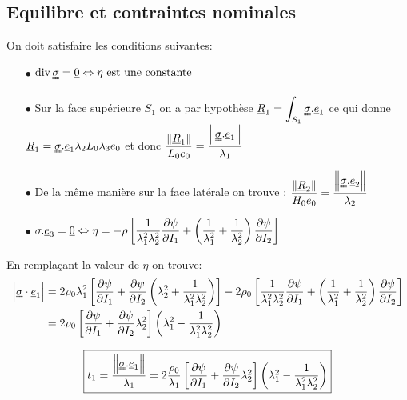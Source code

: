 \documentclass[a4paper,11pt]{article}
\newcommand{\FRAC}{\displaystyle\frac}
\newcommand{\tens}{\uuline}
\newcommand{\verseur}[1]{\uline{e}_{#1}}
\newcommand{\dive}{\mathop{\rm div}}
\begin{document}
\subsection{Equilibre et contraintes nominales}

On doit satisfaire les conditions suivantes:
\begin{itemize}
	\item[$\bullet$] $\dive{\uuline{\sigma}}=\uline{0} \Leftrightarrow \eta \text{ est une constante}$
	\item[$\bullet$] Sur la face supérieure $S_1$ on a par hypothèse $\displaystyle \uline{R}_1=\displaystyle \int_{S_1}\uuline{\sigma}.\uline{e}_1$ ce qui donne $\uline{R}_1=\uuline{\sigma}.\uline{e}_1\lambda_2L_0\lambda_3e_0$ et donc $\dfrac{\left\|\uline{R}_1\right\|}{L_0e_0}=\dfrac{\left\|\uuline{\sigma}.\uline{e}_1\right\|}{\lambda_1}$
	\item[$\bullet$] De la m\^eme mani\`ere sur la face latérale on trouve : $\dfrac{\left\|\uline{R}_2\right\|}{H_0e_0}=\dfrac{\left\|\uuline{\sigma}.\uline{e}_2\right\|}{\lambda_2}$
	\item[$\bullet$] $\displaystyle\sigma.\uline{e}_3=\uline{0}\Leftrightarrow \eta=-\rho\left[\dfrac{1}{\lambda_1^2\lambda_2^2}\dfrac{\partial \psi}{\partial I_1}+\left(\dfrac{1}{\lambda_1^2}+\dfrac{1}{\lambda_2^2}\right)\dfrac{\partial \psi}{\partial I_2}\right] $
\end{itemize}

En remplaçant la valeur de $\eta$ on trouve:
\begin{align*}
\left| \tens{\sigma} \cdot \verseur{1} \right| &= 2 \rho_0 \lambda_1^2 \left[ \FRAC{\partial\psi}{\partial I_1} + \FRAC{\partial\psi}{\partial I_2} \left( \lambda_2^2 + \FRAC{1}{\lambda_1^2 \lambda_2^2} \right) \right] - 2 \rho_0 \left[  \FRAC{1}{\lambda_1^2 \lambda_2^2} \FRAC{\partial\psi}{\partial I_1} + \left( \FRAC{1}{\lambda_1^2} + \FRAC{1}{\lambda_2^2} \right) \FRAC{\partial\psi}{\partial I_2} \right]\\
&=2\rho_0\left[\dfrac{\partial \psi}{\partial I_1}+\dfrac{\partial \psi}{\partial I_2}\lambda_2^2\right]\left(\lambda_1^2-\dfrac{1}{\lambda_1^2\lambda_2^2} \right)
\end{align*}

$$ \fbox{$t_1=\dfrac{\left\|\uuline{\sigma}.\uline{e}_1\right\|}{\lambda_1}= 2\dfrac{\rho_0}{\lambda_1}\left[\dfrac{\partial \psi}{\partial I_1}+\dfrac{\partial \psi}{\partial I_2}\lambda_2^2\right]\left(\lambda_1^2-\dfrac{1}{\lambda_1^2\lambda_2^2} \right)$}
$$
\end{document}
